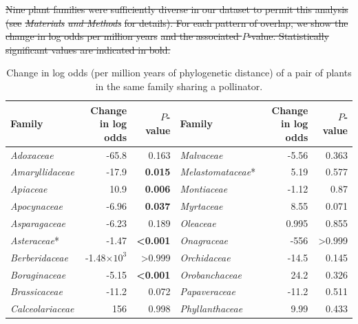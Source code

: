 \documentclass[12pt]{article}
\providecommand{\DIFdel}[1]{{\protect\color{red}\sout{#1}}}                      %
\providecommand{\DIFdelFL}[1]{\DIFdel{#1}} %
\providecommand{\DIFdelendFL}{} %
\DeclareRobustCommand{\DIFdelendFL}{\DIFOaddendFL \let\includegraphics\DIFOincludegraphics} %
\begin{document}
\begin{table}[!h]
\DIFdelFL{Nine plant families were sufficiently diverse in our  dataset to permit this analysis
  (see }\emph{\DIFdelFL{Materials }%
\DIFdelFL{and Methods}} %
\DIFdelFL{for details). For each pattern of overlap, we show the change
  in log odds per million years }%
\DIFdelFL{and the associated $P$-value. Statistically significant values are
  indicated in bold. }%


\DIFdelendFL \caption{
  \small Change in log odds (per million years of phylogenetic distance) of a pair of plants in the same family sharing a pollinator.}
  \small
  \label{family_slopes_pp}
  \begin{tabular}{|l  rr|| l rr|}
    \hline
    Family  & Change in log odds & $P$-value & Family  & Change in log odds & $P$-value \\
    \hline
    \emph{Adoxaceae}  & -65.8 & 0.163 & \emph{Malvaceae}  & -5.56 & 0.363 \\
    \emph{Amaryllidaceae} & -17.9 & \textbf{0.015}  & \emph{Melastomataceae}* & 5.19  & 0.577 \\
    \emph{Apiaceae} & 10.9  & \textbf{0.006}  & \emph{Montiaceae} & -1.12 & 0.87  \\
    \emph{Apocynaceae}  & -6.96 & \textbf{0.037}  & \emph{Myrtaceae}  & 8.55  & 0.071 \\
    \emph{Asparagaceae} & -6.23 & 0.189 & \emph{Oleaceae} & 0.995 & 0.855 \\
    \emph{Asteraceae}*  & -1.47 & \textbf{\textless0.001} & \emph{Onagraceae} & -556  & \textgreater0.999 \\
    \emph{Berberidaceae}  & -1.48$\times10^3$ & \textgreater0.999 & \emph{Orchidaceae}  & -14.5 & 0.145 \\
    \emph{Boraginaceae} & -5.15 & \textbf{\textless0.001} & \emph{Orobanchaceae}  & 24.2  & 0.326 \\
    \emph{Brassicaceae} & -11.2 & 0.072 & \emph{Papaveraceae} & -11.2 & 0.511 \\
    \emph{Calceolariaceae}  & 156 & 0.998 & \emph{Phyllanthaceae} & 9.99  & 0.433 \\

\end{tabular}
\end{table}
\end{document}
